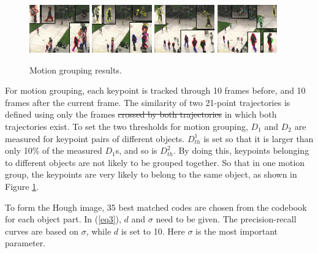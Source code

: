 \documentclass{mva2011}
\begin{document}
\begin{figure}
\centering
\includegraphics[width=0.23\textwidth,bb=0 0 720 576]{a16.jpg}
\includegraphics[width=0.23\textwidth,bb=0 0 720 576]{a26.jpg}
\includegraphics[width=0.23\textwidth,bb=0 0 720 576]{a71.jpg}
\includegraphics[width=0.23\textwidth,bb=0 0 720 576]{a116.jpg}
\caption{Motion grouping results.}
\label{fig:mgr}
\end{figure}

For motion grouping, each keypoint is tracked through 10 frames before, and 10 frames after the current frame. The similarity of two 21-point trajectories is defined using only   the frames \sout{crossed by both trajectories}{\color{red} in which both trajectories exist}. To set the two thresholds for motion grouping, $D_1$ and $D_2$ are  measured for keypoint pairs of different objects. $D^1_{th}$ is set so that it is larger than only 10\% of the measured $D_1$s, and so is $D^2_{th}$. By doing this, keypoints belonging to different objects are not likely to be grouped together. So that in one motion group, the keypoints are very likely to belong to the same object, as shown in Figure \ref{fig:mgr}.

To form the Hough image, 35 best matched codes are chosen from the codebook for each object part. In (\ref{eq3}), $d$ and $\sigma$ need to be given. The precision-recall curves are based on $\sigma$, while $d$ is set to 10. Here $\sigma$ is the most important parameter.
\end{document}

